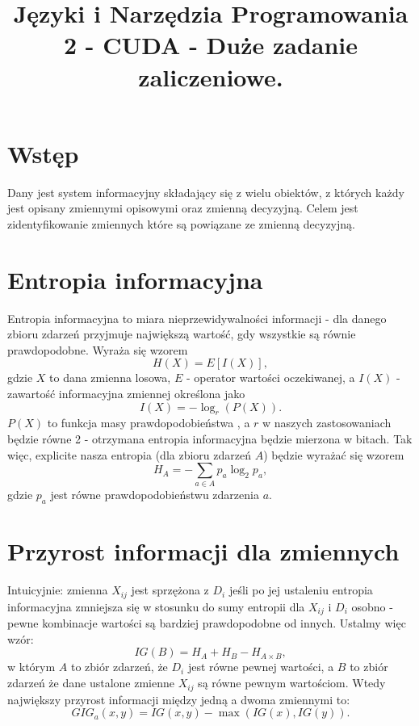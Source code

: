 \documentclass[a4paper]{article}
\title{Języki i Narzędzia Programowania 2 - CUDA - Duże zadanie zaliczeniowe.}
\begin{document}
    \maketitle
    \section{Wstęp}
    Dany jest system informacyjny składający się z wielu obiektów, z których każdy jest opisany zmiennymi opisowymi oraz zmienną decyzyjną. Celem jest zidentyfikowanie zmiennych które są powiązane ze zmienną decyzyjną.
    \section{Entropia informacyjna}
    Entropia informacyjna to miara nieprzewidywalności informacji - dla danego zbioru zdarzeń przyjmuje największą wartość, gdy wszystkie są równie prawdopodobne. Wyraża się wzorem
    \begin{equation} H(X) = E[I(X)], \end{equation}
gdzie $X$ to dana zmienna losowa, $E$ - operator wartości oczekiwanej, a $I(X)$ - zawartość informacyjna zmiennej określona jako
    \begin{equation} I(X) = -\log_r(P(X)). \end{equation}
$P(X)$ to funkcja masy prawdopodobieństwa , a $r$ w naszych zastosowaniach będzie równe 2 - otrzymana entropia informacyjna będzie mierzona w bitach. Tak więc, explicite nasza entropia (dla zbioru zdarzeń $A$) będzie wyrażać się wzorem
    \begin{equation} H_A = -\sum\limits_{a\in A} p_a \log_2 p_a, \end{equation}
gdzie $p_a$ jest równe prawdopodobieństwu zdarzenia $a$.
    \section{Przyrost informacji dla zmiennych}
    Intuicyjnie: zmienna $X_{ij}$ jest sprzężona z $D_i$ jeśli po jej ustaleniu entropia informacyjna zmniejsza się w stosunku do sumy entropii dla $X_{ij}$ i $D_i$ osobno - pewne kombinacje wartości są bardziej prawdopodobne od innych. Ustalmy więc wzór:
    \begin{equation} IG(B) = H_A +H_B - H_{A\times B}, \end{equation}
    w którym $A$ to zbiór zdarzeń, że $D_i$ jest równe pewnej wartości, a $B$ to zbiór zdarzeń że dane ustalone zmienne $X_{ij}$ są równe pewnym wartościom. Wtedy największy przyrost informacji między jedną a dwoma zmiennymi to:
    \begin{equation} GIG_{a}(x,y) = IG(x,y) - \max(IG(x), IG(y)). \end{equation}
\end{document}
